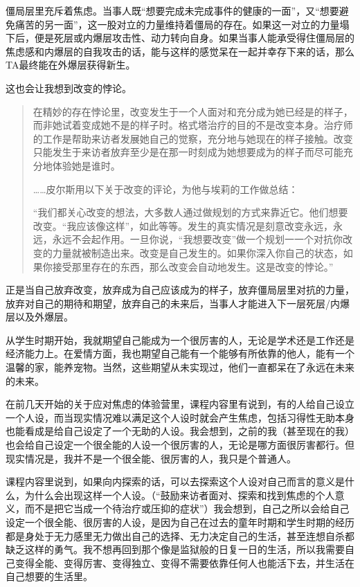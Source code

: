 僵局层里充斥着焦虑。当事人既“想要完成未完成事件的健康的一面”，又“想要避免痛苦的另一面”，这一股对立的力量维持着僵局的存在。如果这一对立的力量塌下后，便是死层或内爆层\pozhehao{}攻击性、动力转向自身。如果当事人能承受得住僵局层的焦虑感和内爆层的自我攻击的话，能与这样的感觉呆在一起并幸存下来的话，那么TA最终能在外爆层获得新生。

这也会让我想到改变的悖论。

\blockquote{
在精妙的存在悖论里，改变发生于一个人面对和充分成为她已经是的样子，而非她试着变成她不是的样子时。格式塔治疗的目的不是改变本身。治疗师的工作是帮助来访者发展她自己的觉察，充分地与她现在的样子接触。改变只能发生于来访者放弃\pozhehao{}至少是在那一时刻成为她想要成为的样子而尽可能充分地体验她是谁时。

……皮尔斯用以下关于改变的评论，为他与埃莉的工作做总结：

“我们都关心改变的想法，大多数人通过做规划的方式来靠近它。他们想要改变。“我应该像这样”，如此等等。发生的真实情况是刻意改变永远，永远，永远不会起作用。一旦你说，“我想要改变”做一个规划一一个对抗你改变的力量就被制造出来。改变是自己发生的。如果你深入你自己的状态，如果你接受那里存在的东西，那么改变会自动地发生。这是改变的悖论。”

}

正是当自己放弃改变，放弃成为自己应该成为的样子，放弃僵局层里对抗的力量，放弃对自己的期待和期望，放弃自己的未来后，当事人才能进入下一层\pozhehao{}死层/内爆层以及外爆层。

从学生时期开始，我就期望自己能成为一个很厉害的人，无论是学术还是工作还是经济能力上。在爱情方面，我也期望自己能有一个能够有所依靠的他人，能有一个温馨的家，能养宠物。当然，这些期望从未实现过，他们一直都呆在了永远在未来的未来。

在前几天开始的关于应对焦虑的体验营里，课程内容里有说到，有的人给自己设立一个人设，而当现实情况难以满足这个人设时就会产生焦虑，包括习得性无助本身也能看成是给自己设定了一个无助的人设。我会想到，之前的我（甚至现在的我）也会给自己设定一个很全能的人设\pozhehao{}一个很厉害的人，无论是哪方面很厉害都行。但现实情况是，我并不是一个很全能、很厉害的人，我只是个普通人。

课程内容里说到，如果向内探索的话，可以去探索这个人设对自己而言的意义是什么，为什么会出现这样一个人设。（“鼓励来访者面对、探索和找到焦虑的个人意义，而不是把它当成一个待治疗或压抑的症状”）我会想到，自己之所以会给自己设定一个很全能、很厉害的人设，是因为自己在过去的童年时期和学生时期的经历都是身处于无力感里\pozhehao{}无力做出自己的选择、无力决定自己的生活，甚至连想自杀都缺乏这样的勇气。我不想再回到那个像是监狱般的日复一日的生活，所以我需要自己变得全能、变得厉害、变得独立、变得不需要依靠任何人也能活下去，并生活在自己想要的生活里。

